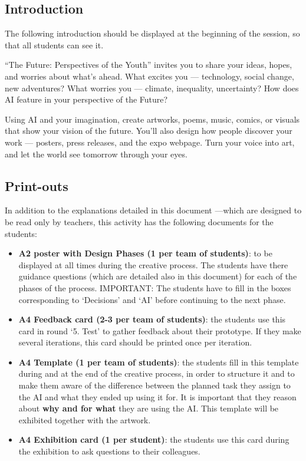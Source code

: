 \documentclass[12pt]{article}
\newcounter{question}
\begin{document}
\subsection{Introduction} 

The following introduction should be displayed at the beginning of the session, so that all students can see it.



\begin{importantbox}
“The Future: Perspectives of the Youth” invites you to share your ideas, hopes, and worries about what’s ahead. What excites you — technology, social change, new adventures? What worries you — climate, inequality, uncertainty? How does AI feature in your perspective of the Future?

Using AI and your imagination, create artworks, poems, music, comics, or visuals that show your vision of the future. You’ll also design how people discover your work — posters, press releases, and the expo webpage. Turn your voice into art, and let the world see tomorrow through your eyes.

\end{importantbox}

\subsection{Print-outs}

In addition to the explanations detailed in this document ---which are designed to be read only by teachers, this activity has the following documents for the students:

\begin{itemize}
    \item \textbf{A2 poster with Design Phases (1 per team of students)}: to be displayed at all times during the creative process. The students have there guidance questions (which are detailed also in this document) for each of the phases of the process. IMPORTANT: The students have to fill in the boxes corresponding to `Decisions' and `AI' before continuing to the next phase.

    \item \textbf{A4 Feedback card (2-3 per team of students)}: the students use this card in round `5. Test' to gather feedback about their prototype. If they make several iterations, this card should be printed once per iteration. 

    \item \textbf{A4 Template (1 per team of students)}: the students fill in this template during and at the end of the creative process, in order to structure it and to make them aware of the difference between the planned task they assign to the AI and what they ended up using it for. It is important that they reason about \textbf{why and for what} they are using the AI. This template will be exhibited together with the artwork. 

    \item \textbf{A4 Exhibition card (1 per student)}: the students use this card during the exhibition to ask questions to their colleagues.
    
\end{itemize}
\end{document}
